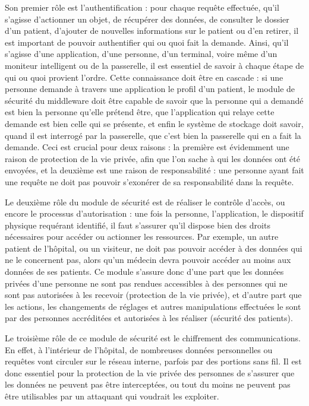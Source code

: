 Son premier rôle est l’authentification : pour chaque requête effectuée, qu’il s’agisse d’actionner un objet, de récupérer des données, de consulter le dossier d’un patient, d’ajouter de nouvelles informations sur le patient ou d’en retirer, il est important de pouvoir authentifier qui ou quoi fait la demande. Ainsi, qu’il s’agisse d’une application, d’une personne, d’un terminal, voire même d’un moniteur intelligent ou de la passerelle, il est essentiel de savoir à chaque étape de qui ou quoi provient l’ordre. Cette connaissance doit être en cascade : si une personne demande à travers une application le profil d’un patient, le module de sécurité du middleware doit être capable de savoir que la personne qui a demandé est bien la personne qu’elle prétend être, que l’application qui relaye cette demande est bien celle qui se présente, et enfin le système de stockage doit savoir, quand il est interrogé par la passerelle, que c’est bien la passerelle qui en a fait la demande. Ceci est crucial pour deux raisons : la première est évidemment une raison de protection de la vie privée, afin que l’on sache à qui les données ont été envoyées, et la deuxième est une raison de responsabilité : une personne ayant fait une requête ne doit pas pouvoir s’exonérer de sa responsabilité dans la requête.

Le deuxième rôle du module de sécurité est de réaliser le contrôle d’accès, ou encore le processus d’autorisation : une fois la personne, l’application, le dispositif physique requérant identifié, il faut s’assurer qu’il dispose bien des droits nécessaires pour accéder ou actionner les ressources. Par exemple, un autre patient de l’hôpital, ou un visiteur, ne doit pas pouvoir accéder à des données qui ne le concernent pas, alors qu’un médecin devra pouvoir accéder au moins aux données de ses patients. Ce module s’assure donc d’une part que les données privées d’une personne ne sont pas rendues accessibles à des personnes qui ne sont pas autorisées à les recevoir (protection de la vie privée), et d’autre part que les actions, les changements de réglages et autres manipulations effectuées le sont par des personnes accréditées et autorisées à les réaliser (sécurité des patients).

Le troisième rôle de ce module de sécurité est le chiffrement des communications. En effet, à l’intérieur de l’hôpital, de nombreuses données personnelles ou requêtes vont circuler sur le réseau interne, parfois par des portions sans fil. Il est donc essentiel pour la protection de la vie privée des personnes de s’assurer que les données ne peuvent pas être interceptées, ou tout du moins ne peuvent pas être utilisables par un attaquant qui voudrait les exploiter.

